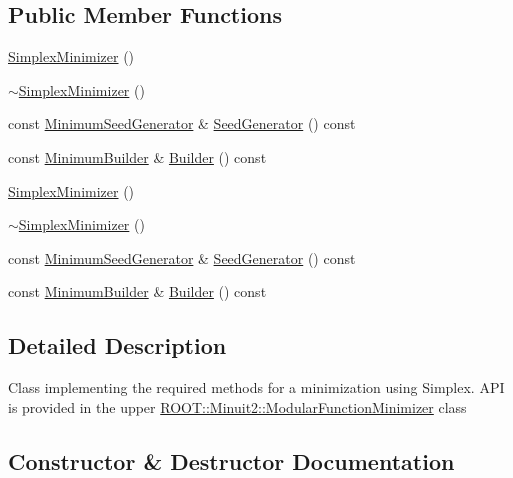 \subsection*{Public Member Functions}
\begin{DoxyCompactItemize}
\item 
\mbox{\hyperlink{classROOT_1_1Minuit2_1_1SimplexMinimizer_a7691b4e4e38176c01ba0f5b5f0acd33f}{Simplex\+Minimizer}} ()
\item 
\mbox{\hyperlink{classROOT_1_1Minuit2_1_1SimplexMinimizer_a52f955e2ed5e48a5816300d1c82c4841}{$\sim$\+Simplex\+Minimizer}} ()
\item 
const \mbox{\hyperlink{classROOT_1_1Minuit2_1_1MinimumSeedGenerator}{Minimum\+Seed\+Generator}} \& \mbox{\hyperlink{classROOT_1_1Minuit2_1_1SimplexMinimizer_a7385d3ee5e4a48a796b11b51f7f0c408}{Seed\+Generator}} () const
\item 
const \mbox{\hyperlink{classROOT_1_1Minuit2_1_1MinimumBuilder}{Minimum\+Builder}} \& \mbox{\hyperlink{classROOT_1_1Minuit2_1_1SimplexMinimizer_a388494c3f9b45ce6c5d91decef737608}{Builder}} () const
\item 
\mbox{\hyperlink{classROOT_1_1Minuit2_1_1SimplexMinimizer_a7691b4e4e38176c01ba0f5b5f0acd33f}{Simplex\+Minimizer}} ()
\item 
\mbox{\hyperlink{classROOT_1_1Minuit2_1_1SimplexMinimizer_a52f955e2ed5e48a5816300d1c82c4841}{$\sim$\+Simplex\+Minimizer}} ()
\item 
const \mbox{\hyperlink{classROOT_1_1Minuit2_1_1MinimumSeedGenerator}{Minimum\+Seed\+Generator}} \& \mbox{\hyperlink{classROOT_1_1Minuit2_1_1SimplexMinimizer_a7385d3ee5e4a48a796b11b51f7f0c408}{Seed\+Generator}} () const
\item 
const \mbox{\hyperlink{classROOT_1_1Minuit2_1_1MinimumBuilder}{Minimum\+Builder}} \& \mbox{\hyperlink{classROOT_1_1Minuit2_1_1SimplexMinimizer_a388494c3f9b45ce6c5d91decef737608}{Builder}} () const
\end{DoxyCompactItemize}


\subsection{Detailed Description}
Class implementing the required methods for a minimization using Simplex. A\+PI is provided in the upper \mbox{\hyperlink{classROOT_1_1Minuit2_1_1ModularFunctionMinimizer}{R\+O\+O\+T\+::\+Minuit2\+::\+Modular\+Function\+Minimizer}} class 

\subsection{Constructor \& Destructor Documentation}
\mbox{\label{classROOT_1_1Minuit2_1_1SimplexMinimizer_a7691b4e4e38176c01ba0f5b5f0acd33f}} 
